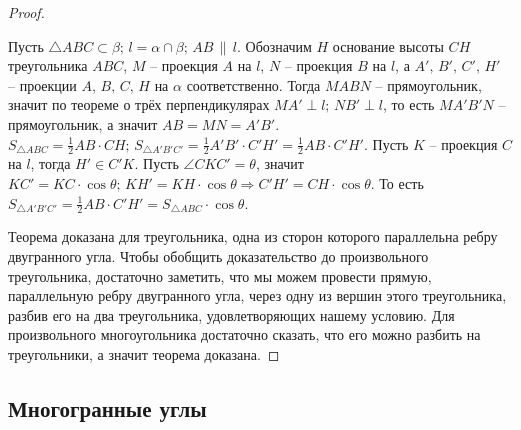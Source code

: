 \documentclass[12pt]{article}
\theoremstyle{definition}
\begin{document}
\begin{proof}
\begin{center}
    \end{center}
    Пусть $\triangle ABC\subset\beta;\,l=\alpha\cap\beta;\,AB\,\|\,l$. Обозначим $H$ основание высоты $CH$ треугольника $ABC$, $M$ – проекция $A$ на $l$, $N$ – проекция $B$ на $l$, а $A',\,B',\,C',\,H'$ – проекции $A,\,B,\,C,\,H$ на $\alpha$ соответственно. Тогда $MABN$ – прямоугольник, значит по теореме о трёх перпендикулярах $MA'\perp l;\,NB'\perp l$, то есть $MA'B'N$ – прямоугольник, а значит $AB=MN=A'B'$. $S_{\triangle ABC}=\frac{1}{2}AB\cdot CH;\,S_{\triangle A'B'C'}=\frac{1}{2}A'B'\cdot C'H'=\frac{1}{2}AB\cdot C'H'$. Пусть $K$ – проекция $C$ на $l$, тогда $H'\in C'K$. Пусть $\angle CKC'=\theta$, значит $KC'=KC\cdot\cos\theta;\,KH'=KH\cdot\cos\theta\Longrightarrow C'H'=CH\cdot\cos\theta$. То есть $S_{\triangle A'B'C'}=\frac{1}{2}AB\cdot C'H'=S_{\triangle ABC}\cdot\cos\theta$.\bigskip

    Теорема доказана для треугольника, одна из сторон которого параллельна ребру двугранного угла. Чтобы обобщить доказательство до произвольного треугольника, достаточно заметить, что мы можем провести прямую, параллельную ребру двугранного угла, через одну из вершин этого треугольника, разбив его на два треугольника, удовлетворяющих нашему условию. Для произвольного многоугольника достаточно сказать, что его можно разбить на треугольники, а значит теорема доказана.
\end{proof}

\subsection{Многогранные углы}
\end{document}

